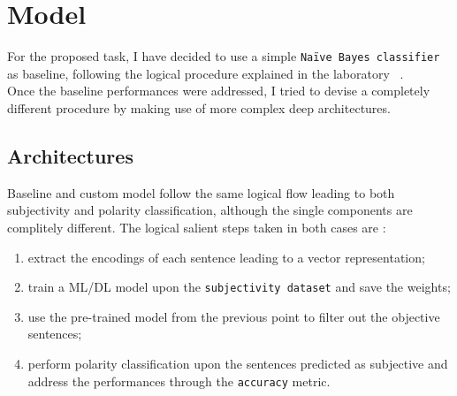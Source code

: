 
\section{Model}
\label{sec:model}
For the proposed task, I have decided to use a simple \texttt{Na\"{i}ve Bayes classifier} as baseline, following the logical procedure explained in the  laboratory 
~\cite{lab11}.\\
Once the baseline performances were addressed, I tried to devise a completely different procedure by making use of more complex deep architectures. \\

\vspace{-1.5em}
\subsection{Architectures}
Baseline and custom model follow the same logical flow leading to both subjectivity and polarity classification, although the single components are complitely different.
The logical salient steps taken in both cases are :
\begin{enumerate}
    \item extract the encodings of each sentence leading to a vector representation;
    \item train a ML/DL model upon the \texttt{subjectivity dataset} and save the weights;
    \item use the pre-trained model from the previous point to filter out the objective sentences;
    \item perform polarity classification upon the sentences predicted as subjective and address the performances through the \texttt{accuracy} metric.
\end{enumerate}

